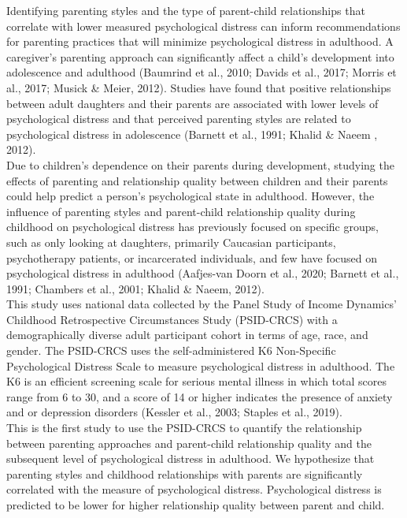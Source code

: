 \documentclass[12pt,letterpaper]{article}
\begin{document}
\doublespacing 
\indent Identifying parenting styles and the type of parent-child relationships that correlate with lower measured psychological distress can inform recommendations for parenting practices that will minimize psychological distress in adulthood. A caregiver’s parenting approach can significantly affect a child’s development into adolescence and adulthood (Baumrind et al., 2010; Davids et al., 2017; Morris et al., 2017; Musick \& Meier, 2012). Studies have found that positive relationships between adult daughters and their parents are associated with lower levels of psychological distress and that perceived parenting styles are related to psychological distress in adolescence (Barnett et al., 1991; Khalid \& Naeem , 2012). \\
\indent Due to children’s dependence on their parents during development, studying the effects of parenting and relationship quality between children and their parents could help predict a person’s psychological state in adulthood. However, the influence of parenting styles and parent-child relationship quality during childhood on psychological distress has previously focused on specific groups, such as only looking at daughters, primarily Caucasian participants, psychotherapy patients, or incarcerated individuals, and few have focused on psychological distress in adulthood (Aafjes-van Doorn et al., 2020; Barnett et al., 1991; Chambers et al., 2001; Khalid \& Naeem, 2012).  \\
\indent This study uses national data collected by the Panel Study of Income Dynamics’ Childhood Retrospective Circumstances Study (PSID-CRCS) with a demographically diverse adult participant cohort in terms of age, race, and gender. The PSID-CRCS uses the self-administered K6 Non-Specific Psychological Distress Scale to measure psychological distress in adulthood. The K6 is an efficient screening scale for serious mental illness in which total scores range from 6 to 30, and a score of 14 or higher indicates the presence of anxiety and or depression disorders (Kessler et al., 2003; Staples et al., 2019). \\
\indent This is the first study to use the PSID-CRCS to quantify the relationship between parenting approaches and parent-child relationship quality and the subsequent level of psychological distress in adulthood. We hypothesize that parenting styles and childhood relationships with parents are significantly correlated with the measure of psychological distress. Psychological distress is predicted to be lower for higher relationship quality between parent and child.
\end{document}
